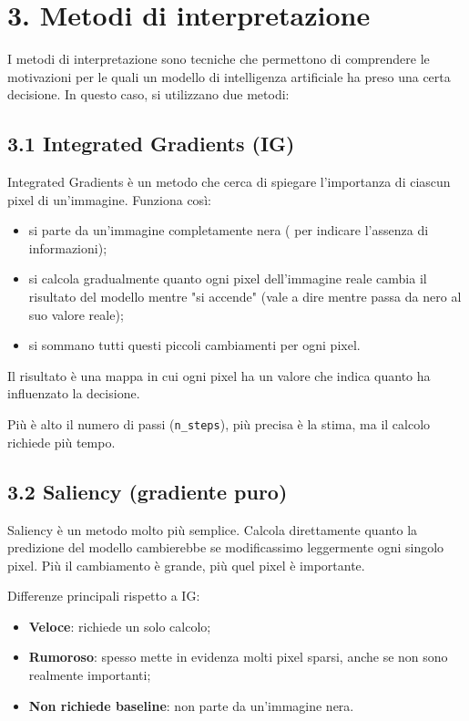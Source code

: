 \documentclass[a4paper,11pt]{article}
\begin{document}
\section*{3. Metodi di interpretazione}
I metodi di interpretazione sono tecniche che permettono di comprendere le motivazioni per le quali un modello di intelligenza artificiale ha preso una certa decisione. In questo caso, si utilizzano due metodi:

\subsection*{3.1 Integrated Gradients (IG)}
Integrated Gradients è un metodo che cerca di spiegare l'importanza di ciascun pixel di un'immagine. Funziona così:
\begin{itemize}
\item si parte da un'immagine completamente nera ( per indicare l'assenza di informazioni);
\item si calcola gradualmente quanto ogni pixel dell'immagine reale cambia il risultato del modello mentre "si accende" (vale a dire mentre passa da nero al suo valore reale);
\item si sommano tutti questi piccoli cambiamenti per ogni pixel.
\end{itemize}
Il risultato è una mappa in cui ogni pixel ha un valore che indica quanto ha influenzato la decisione.

Più è alto il numero di passi (\texttt{n\_steps}), più precisa è la stima, ma il calcolo richiede più tempo.

\subsection*{3.2 Saliency (gradiente puro)}
Saliency è un metodo molto più semplice. Calcola direttamente quanto la predizione del modello cambierebbe se modificassimo leggermente ogni singolo pixel. Più il cambiamento è grande, più quel pixel è importante.

Differenze principali rispetto a IG:
\begin{itemize}
\item \textbf{Veloce}: richiede un solo calcolo;
\item \textbf{Rumoroso}: spesso mette in evidenza molti pixel sparsi, anche se non sono realmente importanti;
\item \textbf{Non richiede baseline}: non parte da un'immagine nera.
\end{itemize}
\end{document}
